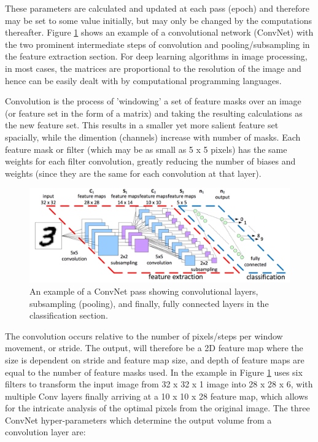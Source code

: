\documentclass[fleqn,twoside]{article}
\begin{document}
These parameters are calculated and updated at each pass (epoch) and therefore may be set to some value initially, but may only be changed by the computations thereafter. Figure \ref{fig:conv3} shows an example of a convolutional network (ConvNet) with the two prominent intermediate steps of convolution and pooling/subsampling in the feature extraction section. For deep learning algorithms in image processing, in most cases, the matrices are proportional to the resolution of the image and hence can be easily dealt with by computational programming languages. 

Convolution is the process of 'windowing' a set of feature masks over an image (or feature set in the form of a matrix) and taking the resulting calculations as the new feature set. This results in a smaller yet more salient feature set spacially, while the dimention (channels) increase with number of masks. Each feature mask or filter (which may be as small as 5 x 5 pixels) has the same weights for each filter convolution, greatly reducing the number of biases and weights (since they are the same for each convolution at that layer). 

\begin{figure}[h]
	\centering
	\includegraphics[width=\textwidth]{conv3.png}
	\caption{An example of a ConvNet pass showing convolutional layers, subsampling (pooling), and finally, fully connected layers in the classification section.}
	\label{fig:conv3}
\end{figure}

The convolution occurs relative to the number of pixels/steps per window movement, or stride. The output, will therefore be a 2D feature map where the size is dependent on stride and feature map size, and depth of feature maps are equal to the number of feature masks used. In the example in Figure \ref{fig:conv3} uses six filters to transform the input image from 32 x 32 x 1 image into 28 x 28 x 6, with multiple Conv layers finally arriving at a 10 x 10 x 28 feature map, which allows for the intricate analysis of the optimal pixels from the original image. The three ConvNet hyper-parameters which determine the output volume from a convolution layer are:
\end{document}
